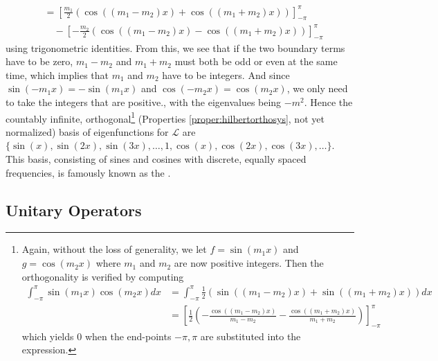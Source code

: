 \begin{solution}
{\begin{align*}
&= [\frac{m_1}{2}(\cos((m_1-m_2)x) + \cos((m_1+m_2)x))]_{-\pi}^\pi \\
&\quad - [-\frac{m_2}{2}(\cos((m_1-m_2)x) - \cos((m_1+m_2)x))]_{-\pi}^\pi 
\end{align*}
using trigonometric identities. From this, we see that if the two boundary terms have to be zero, $m_1 - m_2$ and $m_1 + m_2$ must both be odd or even at the same time, which implies that $m_1$ and $m_2$ have to be integers. And since $\sin(-m_1 x) = -\sin(m_1 x)$ and $\cos(-m_2 x) = \cos(m_2 x)$, we only need to take the integers that are positive.}, with the eigenvalues being $-m^2$. Hence the countably infinite, orthogonal\footnote{Again, without the loss of generality, we let $f = \sin(m_1 x)$ and $g = \cos(m_2 x)$ where $m_1$ and $m_2$ are now positive integers. Then the orthogonality is verified by computing
\begin{align*}
\int_{-\pi}^{\pi} \sin(m_1 x)\cos(m_2 x) dx &= \int_{-\pi}^{\pi} \frac{1}{2} (\sin((m_1 - m_2)x) + \sin((m_1 + m_2)x)) dx \\
&= [\frac{1}{2} (-\frac{\cos((m_1 - m_2)x)}{m_1 - m_2} - \frac{\cos((m_1 + m_2)x)}{m_1 + m_2})]_{-\pi}^{\pi} 
\end{align*}
which yields $0$ when the end-points $-\pi, \pi$ are substituted into the expression.} (Properties \ref{proper:hilbertorthosys}, not yet normalized) basis of eigenfunctions for $\mathcal{L}$ are $\{\sin(x), \sin(2x), \sin(3x), \ldots, 1, \cos(x), \cos(2x), \cos(3x), \ldots\}$. This basis, consisting of sines and cosines with discrete, equally spaced frequencies, is famously known as the .
\end{solution}

\subsection{Unitary Operators}

